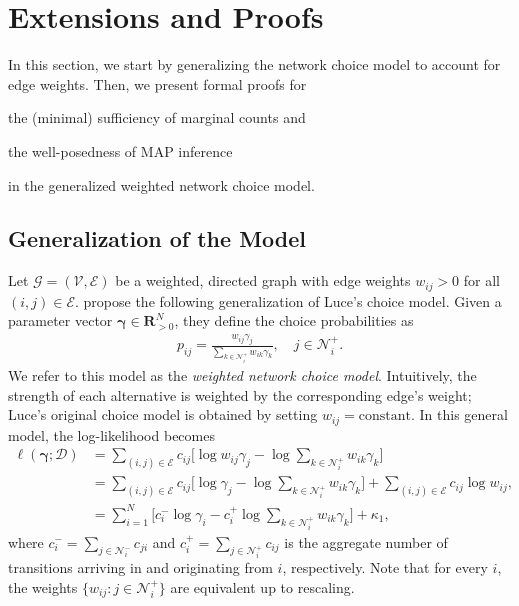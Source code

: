 \section{Extensions and Proofs}  %
\label{cr:app:extensions}

In this section, we start by generalizing the network choice model to account for edge weights.
Then, we present formal proofs for
\begin{enuminline}
\item the (minimal) sufficiency of marginal counts and
\item the well-posedness of MAP inference
\end{enuminline}
in the generalized weighted network choice model.

\subsection{Generalization of the Model}

Let $\mathcal{G} = (\mathcal{V}, \mathcal{E})$ be a weighted, directed graph with edge weights $w_{ij} > 0$ for all $(i, j) \in \mathcal{E}$.
\citet{kumar2015inverting} propose the following generalization of Luce's choice model.
Given a parameter vector $\bm{\gamma} \in \mathbf{R}_{>0}^N$, they define the choice probabilities as
\begin{align}
\label{cr:eq:wsinglelik}
p_{ij} = \frac{w_{ij} \gamma_j}{\sum_{k \in \mathcal{N}^+_i} w_{ik} \gamma_k}, \quad j \in \mathcal{N}^+_i.
\end{align}
We refer to this model as the \emph{weighted network choice model}.
Intuitively, the strength of each alternative is weighted by the corresponding edge's weight;
Luce's original choice model is obtained by setting $w_{ij} = \text{constant}$.
In this general model, the log-likelihood becomes
\begin{align}
\ell(\bm{\gamma} ; \mathcal{D})
    &= \sum_{(i,j) \in \mathcal{E}} c_{ij} \bigg[ \log w_{ij} \gamma_j - \log \sum_{k \in \mathcal{N}^+_i} w_{ik} \gamma_k \bigg] \nonumber \\
    &= \sum_{(i,j) \in \mathcal{E}} c_{ij} \bigg[ \log \gamma_j - \log \sum_{k \in \mathcal{N}^+_i} w_{ik} \gamma_k \bigg] \nonumber
       + \sum_{(i,j) \in \mathcal{E}} c_{ij} \log w_{ij}, \nonumber \\
    &= \sum_{i = 1}^N \bigg[ c^-_i \log \gamma_i - c^+_i \log\!\sum_{k \in \mathcal{N}^+_i}\!w_{ik} \gamma_k \bigg] + \kappa_1, \label{cr:eq:wloglik}
\end{align}
where $c^-_i = \sum_{j \in \mathcal{N}^-_i} c_{ji}$ and $c^+_i = \sum_{j \in \mathcal{N}^+_i} c_{ij}$ is the aggregate number of transitions arriving in and originating from $i$, respectively.
Note that for every $i$, the weights $\{ w_{ij} : j \in \mathcal{N}^+_i \}$ are equivalent up to rescaling.

